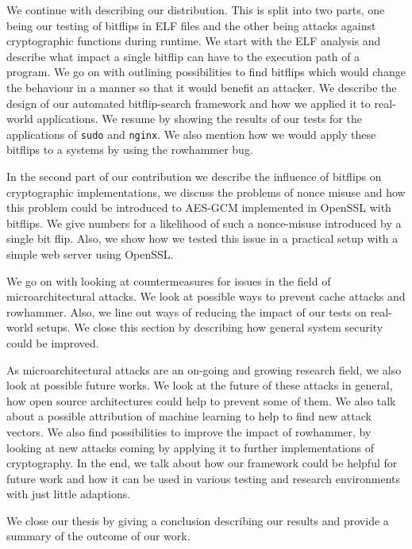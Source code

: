 We continue with describing our distribution. This is split into two parts, one
being our testing of bitflips in ELF files and the other being attacks against
cryptographic functions during runtime. We start with the ELF analysis and
describe what impact a single bitflip can have to the execution path of a
program. We go on with outlining possibilities to find bitflips which would
change the behaviour in a manner so that it would benefit an attacker. We
describe the design of our automated bitflip-search framework and how we applied
it to real-world applications. We resume by showing the results of our tests for
the applications of \texttt{sudo} and \texttt{nginx}. We also mention how we
would apply these bitflips to a systems by using the rowhammer bug.

In the second part of our contribution we describe the influence of bitflips on
cryptographic implementations, we discuss the problems of nonce misuse and how
this problem could be introduced to AES-GCM implemented in OpenSSL with
bitflips. We give numbers for a likelihood of such a nonce-misuse introduced by
a single bit flip. Also, we show how we tested this issue in a practical setup
with a simple web server using OpenSSL.

We go on with looking at countermeasures for issues in the field of
microarchitectural attacks. We look at possible ways to prevent cache attacks
and rowhammer. Also, we line out ways of reducing the impact of our tests on
real-world setups. We close this section by describing how general system
security could be improved.

As microarchitectural attacks are an on-going and growing research field, we
also look at possible future works. We look at the future of these attacks in
general, how open source architectures could help to prevent some of them. We
also talk about a possible attribution of machine learning to help to find new
attack vectors. We also find possibilities to improve the impact of rowhammer,
by looking at new attacks coming by applying it to further implementations of
cryptography. In the end, we talk about how our framework could be helpful for
future work and how it can be used in various testing and research environments
with just little adaptions.

We close our thesis by giving a conclusion describing our results and provide a
summary of the outcome of our work.

